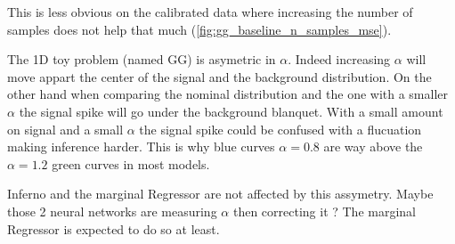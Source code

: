 This is less obvious on the calibrated data where increasing the number of samples does not help that much (\autoref{fig:gg_baseline_n_samples_mse}).

The 1D toy problem (named GG) is asymetric in $\alpha$.
Indeed increasing $\alpha$ will move appart the center of the signal and the background distribution.
On the other hand when comparing the nominal distribution and the one with a smaller $\alpha$ the signal spike will go under the background blanquet.
With a small amount on signal and a small $\alpha$ the signal spike could be confused with a flucuation making inference harder.
This is why blue curves $\alpha=0.8$ are way above the $\alpha=1.2$ green curves in most models.

Inferno and the marginal Regressor are not affected by this assymetry.
Maybe those 2 neural networks are measuring $\alpha$ then correcting it ?
The marginal Regressor is expected to do so at least.


